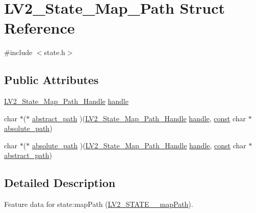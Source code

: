 \hypertarget{struct_l_v2___state___map___path}{}\section{L\+V2\+\_\+\+State\+\_\+\+Map\+\_\+\+Path Struct Reference}
\label{struct_l_v2___state___map___path}


{\ttfamily \#include $<$state.\+h$>$}

\subsection*{Public Attributes}
\begin{DoxyCompactItemize}
\item 
\hyperlink{state_8h_ac09389ce99f6350944d66d992c7d8a2a}{L\+V2\+\_\+\+State\+\_\+\+Map\+\_\+\+Path\+\_\+\+Handle} \hyperlink{struct_l_v2___state___map___path_a1f69f5f23da52535ba9ea887504a15b7}{handle}
\item 
char $\ast$($\ast$ \hyperlink{struct_l_v2___state___map___path_a850e9ac4229d1db077b4db6484cf4dd7}{abstract\+\_\+path} )(\hyperlink{state_8h_ac09389ce99f6350944d66d992c7d8a2a}{L\+V2\+\_\+\+State\+\_\+\+Map\+\_\+\+Path\+\_\+\+Handle} \hyperlink{struct_l_v2___state___map___path_a1f69f5f23da52535ba9ea887504a15b7}{handle}, \hyperlink{getopt1_8c_a2c212835823e3c54a8ab6d95c652660e}{const} char $\ast$\hyperlink{struct_l_v2___state___map___path_a1b84232ea39fbaf8444ca437a0480b8f}{absolute\+\_\+path})
\item 
char $\ast$($\ast$ \hyperlink{struct_l_v2___state___map___path_a1b84232ea39fbaf8444ca437a0480b8f}{absolute\+\_\+path} )(\hyperlink{state_8h_ac09389ce99f6350944d66d992c7d8a2a}{L\+V2\+\_\+\+State\+\_\+\+Map\+\_\+\+Path\+\_\+\+Handle} \hyperlink{struct_l_v2___state___map___path_a1f69f5f23da52535ba9ea887504a15b7}{handle}, \hyperlink{getopt1_8c_a2c212835823e3c54a8ab6d95c652660e}{const} char $\ast$\hyperlink{struct_l_v2___state___map___path_a850e9ac4229d1db077b4db6484cf4dd7}{abstract\+\_\+path})
\end{DoxyCompactItemize}


\subsection{Detailed Description}
Feature data for state\+:map\+Path (\hyperlink{state_8h_a9d4aab8379a2162c814a312c8b39db49}{L\+V2\+\_\+\+S\+T\+A\+T\+E\+\_\+\+\_\+map\+Path}). 

